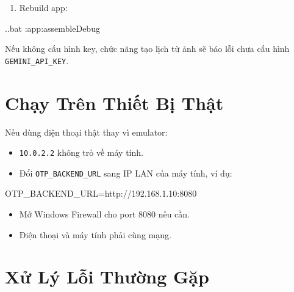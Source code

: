 \documentclass[12pt,a4paper]{report}
\begin{document}
\begin{enumerate}
\item Rebuild app:
\end{enumerate}

\begin{CodeBlock}
.\gradlew.bat :app:assembleDebug
\end{CodeBlock}

Nếu không cấu hình key, chức năng tạo lịch từ ảnh sẽ báo lỗi chưa cấu hình \texttt{GEMINI\_API\_KEY}.

\section{Chạy Trên Thiết Bị Thật}

Nếu dùng điện thoại thật thay vì emulator:

\begin{itemize}
\item \texttt{10.0.2.2} không trỏ về máy tính.
\item Đổi \texttt{OTP\_BACKEND\_URL} sang IP LAN của máy tính, ví dụ:
\end{itemize}

\begin{CodeBlock}
OTP_BACKEND_URL=http://192.168.1.10:8080
\end{CodeBlock}

\begin{itemize}
\item Mở Windows Firewall cho port 8080 nếu cần.
\item Điện thoại và máy tính phải cùng mạng.
\end{itemize}

\section{Xử Lý Lỗi Thường Gặp}
\end{document}
